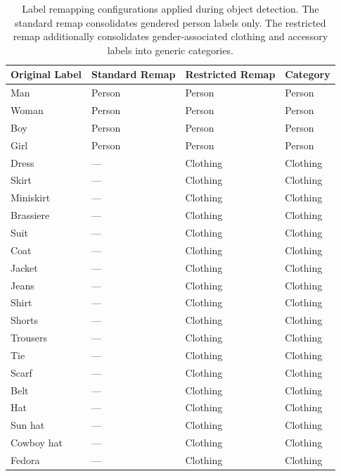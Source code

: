 \begin{table}[ht]
	\centering
	\caption{Label remapping configurations applied during object detection. 
		The standard remap consolidates gendered person labels only. The 
		restricted remap additionally consolidates gender-associated clothing 
		and accessory labels into generic categories.}
	\label{tab:label_remap}
	\begin{tabular}{llll}
		\hline
		\textbf{Original Label} & \textbf{Standard Remap} & 
		\textbf{Restricted Remap} & \textbf{Category} \\
		\hline
		Man            & Person  & Person  & Person \\
		Woman          & Person  & Person  & Person \\
		Boy            & Person  & Person  & Person \\
		Girl           & Person  & Person  & Person \\
		\hline
		Dress          & ---     & Clothing & Clothing \\
		Skirt          & ---     & Clothing & Clothing \\
		Miniskirt      & ---     & Clothing & Clothing \\
		Brassiere      & ---     & Clothing & Clothing \\
		Suit           & ---     & Clothing & Clothing \\
		Coat           & ---     & Clothing & Clothing \\
		Jacket         & ---     & Clothing & Clothing \\
		Jeans          & ---     & Clothing & Clothing \\
		Shirt          & ---     & Clothing & Clothing \\
		Shorts         & ---     & Clothing & Clothing \\
		Trousers       & ---     & Clothing & Clothing \\
		Tie            & ---     & Clothing & Clothing \\
		Scarf          & ---     & Clothing & Clothing \\
		Belt           & ---     & Clothing & Clothing \\
		Hat            & ---     & Clothing & Clothing \\
		Sun hat        & ---     & Clothing & Clothing \\
		Cowboy hat     & ---     & Clothing & Clothing \\
		Fedora         & ---     & Clothing & Clothing \\

\end{tabular}
\end{table}
